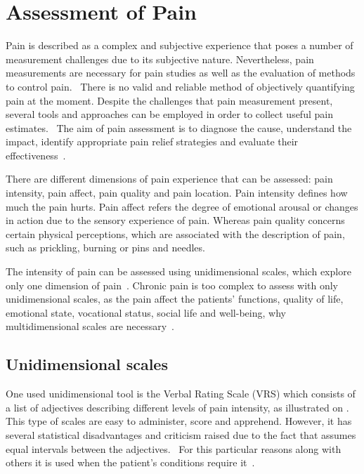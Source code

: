 \section{Assessment of Pain}
Pain is described as a complex and subjective experience that poses a number of measurement challenges due to its subjective nature. Nevertheless, pain measurements are necessary for pain studies as well as the evaluation of methods to control pain.~\cite{Jensen2001} There is no valid and reliable method of objectively quantifying pain at the moment. Despite the challenges that pain measurement present, several tools and approaches can be employed in order to collect useful pain estimates.~\cite{Younger2010} The aim of pain assessment is to diagnose the cause, understand the impact, identify appropriate pain relief strategies and evaluate their effectiveness~\cite{Briggs2010}.

There are different dimensions of pain experience that can be assessed: pain intensity, pain affect, pain quality and pain location. Pain intensity defines how much the pain hurts. %
Pain affect refers the degree of emotional arousal or changes in action due to the sensory experience of pain. Whereas pain quality concerns certain physical perceptions, which are associated with the description of pain, such as prickling, burning or pins and needles.  

The intensity of pain can be assessed using unidimensional scales, which explore only one dimension of pain~\cite{Jensen2001}. %
Chronic pain is too complex to assess with only unidimensional scales, as the pain affect the patients' functions, quality of life, emotional state, vocational status, social life and well-being, why multidimensional scales are necessary~\cite{Ebert2010}. 


\subsection{Unidimensional scales}
One used unidimensional tool is the Verbal Rating Scale (VRS) which consists of a list of adjectives describing different levels of pain intensity, as illustrated on . This type of scales are easy to administer, score and apprehend. However, it has several statistical disadvantages and criticism raised due to the fact that assumes equal intervals between the adjectives.~\cite{Jensen2001} For this particular reasons along with others it is used when the patient's conditions require it~\cite{Jensen1986}. 

